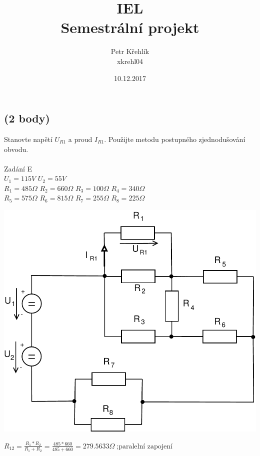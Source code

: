 \documentclass{article}
\title{\Huge IEL\\Semestrální projekt}
\author{\huge Petr Křehlík\\\Large xkrehl04}
\date{\Large 10.12.2017}
\begin{document}
\maketitle

\pagebreak

\begin{large}

\section{(2 body)}



    Stanovte napětí $U_{R1}$ a proud $I_{R1}$. Použijte metodu postupného zjednodušování obvodu.\\~\\ 
    Zadání E\\
    $U_1=115V$
    $U_2=55V$\\
    $R_1=485\Omega$
    $R_2=660\Omega$
    $R_3=100\Omega$
    $R_4=340\Omega$\\
    $R_5=575\Omega$
    $R_6=815\Omega$
    $R_7=255\Omega$
    $R_8=225\Omega$


\begin{center}
    \includegraphics[scale=0.5]{Pr1/Pr1_2017.pdf}
\end{center}


    $R_{12}=\frac{R_1*R_2}{R_1+R_2}=\frac{485*660}{485+660}=279.5633\Omega\;\text{;paralelní zapojení}$\\


\end{large}
\end{document}

